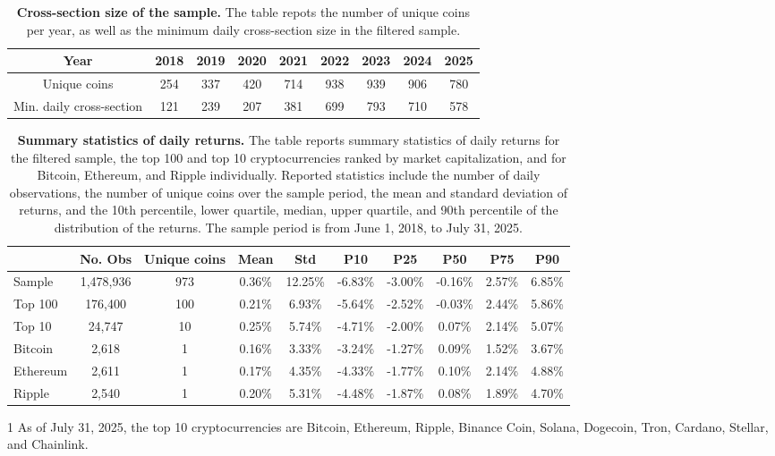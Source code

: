\documentclass[
  12pt,
  a4paper,
  openany]{scrbook}
\begin{document}
\begin{table}[t]
\footnotesize
\centering
\caption[Cross-section size of the sample]{\textbf{Cross-section size of the sample.} The table repots the number of unique coins per year, as well as the minimum daily cross-section size in the filtered sample.}
\label{tbl-cross_section}
\begin{tabular}{ccccccccc}
\toprule
Year & 2018 & 2019 & 2020 & 2021 & 2022 & 2023 & 2024 & 2025 \\
\midrule
Unique coins & 254 & 337 & 420 & 714 & 938 & 939 & 906 & 780 \\
Min. daily cross-section & 121 & 239 & 207 & 381 & 699 & 793 & 710 & 578 \\
\bottomrule
\end{tabular}
\end{table}

\begin{table}[t]
\centering
\caption[Summary statistics of daily returns]{\textbf{Summary statistics of daily returns.} The table reports summary statistics of daily returns for the filtered sample, the top 100 and top 10 cryptocurrencies ranked by market capitalization, and for Bitcoin, Ethereum, and Ripple individually. Reported statistics include the number of daily observations, the number of unique coins over the sample period, the mean and standard deviation of returns, and the 10th percentile, lower quartile, median, upper quartile, and 90th percentile of the distribution of the returns. The sample period is from June 1, 2018, to July 31, 2025.}
\label{tbl-overview}
\begin{adjustbox}{max width=\textwidth}
\begin{threeparttable}
\begin{tabular}{lccccccccc}
\toprule
 & No. Obs & Unique coins & Mean & Std & P10 & P25 & P50 & P75 & P90 \\
\midrule
Sample & 1,478,936 & 973 & 0.36\% & 12.25\% & -6.83\% & -3.00\% & -0.16\% & 2.57\% & 6.85\% \\
Top 100 & 176,400 & 100 & 0.21\% & 6.93\% & -5.64\% & -2.52\% & -0.03\% & 2.44\% & 5.86\% \\
Top 10 & 24,747 & 10 & 0.25\% & 5.74\% & -4.71\% & -2.00\% & 0.07\% & 2.14\% & 5.07\% \\
Bitcoin & 2,618 & 1 & 0.16\% & 3.33\% & -3.24\% & -1.27\% & 0.09\% & 1.52\% & 3.67\% \\
Ethereum & 2,611 & 1 & 0.17\% & 4.35\% & -4.33\% & -1.77\% & 0.10\% & 2.14\% & 4.88\% \\
Ripple & 2,540 & 1 & 0.20\% & 5.31\% & -4.48\% & -1.87\% & 0.08\% & 1.89\% & 4.70\% \\
\bottomrule
\end{tabular}
\begin{tablenotes}\footnotesize
\item[1] As of July 31, 2025, the top 10 cryptocurrencies are Bitcoin, Ethereum, Ripple, Binance Coin, Solana, Dogecoin, Tron, Cardano, Stellar, and Chainlink.
\end{tablenotes}
\end{threeparttable}
\end{adjustbox}
\end{table}
\end{document}
